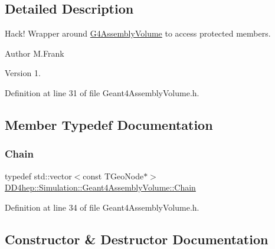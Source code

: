 \subsection{Detailed Description}
Hack! Wrapper around \hyperlink{class_g4_assembly_volume}{G4\+Assembly\+Volume} to access protected members. 

\begin{DoxyAuthor}{Author}
M.\+Frank 
\end{DoxyAuthor}
\begin{DoxyVersion}{Version}
1. 
\end{DoxyVersion}


Definition at line 31 of file Geant4\+Assembly\+Volume.\+h.



\subsection{Member Typedef Documentation}
\hypertarget{class_d_d4hep_1_1_simulation_1_1_geant4_assembly_volume_ad79481b292635c219fcc03d160689211}{}\label{class_d_d4hep_1_1_simulation_1_1_geant4_assembly_volume_ad79481b292635c219fcc03d160689211} 
\subsubsection{\texorpdfstring{Chain}{Chain}}
{\footnotesize\ttfamily typedef std\+::vector$<$const T\+Geo\+Node$\ast$$>$ \hyperlink{class_d_d4hep_1_1_simulation_1_1_geant4_assembly_volume_ad79481b292635c219fcc03d160689211}{D\+D4hep\+::\+Simulation\+::\+Geant4\+Assembly\+Volume\+::\+Chain}}



Definition at line 34 of file Geant4\+Assembly\+Volume.\+h.



\subsection{Constructor \& Destructor Documentation}
\hypertarget{class_d_d4hep_1_1_simulation_1_1_geant4_assembly_volume_a140dd17a22b41606681a2494737ed02a}{}\label{class_d_d4hep_1_1_simulation_1_1_geant4_assembly_volume_a140dd17a22b41606681a2494737ed02a} 
